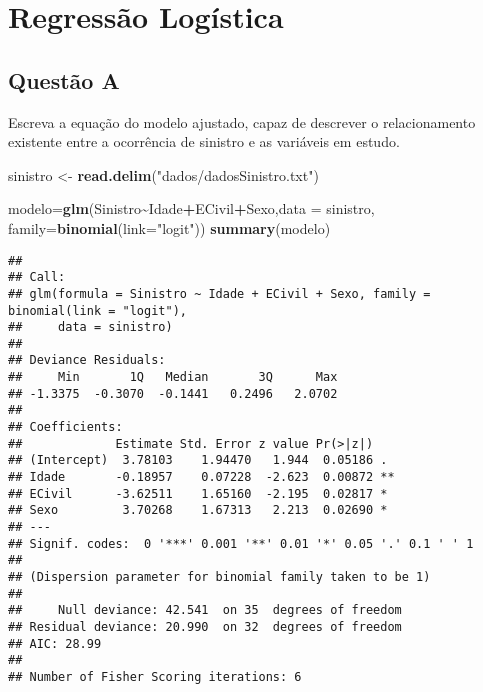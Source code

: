 \documentclass[
]{article}
\newenvironment{Shaded}{\begin{snugshade}}{\end{snugshade}}
\newcommand{\AttributeTok}[1]{\textcolor[rgb]{0.13,0.29,0.53}{#1}}
\newcommand{\FunctionTok}[1]{\textcolor[rgb]{0.13,0.29,0.53}{\textbf{#1}}}
\newcommand{\NormalTok}[1]{#1}
\newcommand{\OtherTok}[1]{\textcolor[rgb]{0.56,0.35,0.01}{#1}}
\newcommand{\SpecialCharTok}[1]{\textcolor[rgb]{0.81,0.36,0.00}{\textbf{#1}}}
\newcommand{\StringTok}[1]{\textcolor[rgb]{0.31,0.60,0.02}{#1}}
\begin{document}
\hypertarget{regressuxe3o-loguxedstica}{%
\section{Regressão Logística}\label{regressuxe3o-loguxedstica}}

\hypertarget{questuxe3o-a-1}{%
\subsection{Questão A}\label{questuxe3o-a-1}}

Escreva a equação do modelo ajustado, capaz de descrever o
relacionamento existente entre a ocorrência de sinistro e as variáveis
em estudo.

\begin{Shaded}
\begin{Highlighting}[]
\NormalTok{sinistro }\OtherTok{\textless{}{-}} \FunctionTok{read.delim}\NormalTok{(}\StringTok{"dados/dadosSinistro.txt"}\NormalTok{)}
\end{Highlighting}
\end{Shaded}

\begin{Shaded}
\begin{Highlighting}[]
\NormalTok{modelo}\OtherTok{=}\FunctionTok{glm}\NormalTok{(Sinistro}\SpecialCharTok{\textasciitilde{}}\NormalTok{Idade}\SpecialCharTok{+}\NormalTok{ECivil}\SpecialCharTok{+}\NormalTok{Sexo,}\AttributeTok{data =}\NormalTok{ sinistro,}
           \AttributeTok{family=}\FunctionTok{binomial}\NormalTok{(}\AttributeTok{link=}\StringTok{"logit"}\NormalTok{))}
\FunctionTok{summary}\NormalTok{(modelo)}
\end{Highlighting}
\end{Shaded}

\begin{verbatim}
## 
## Call:
## glm(formula = Sinistro ~ Idade + ECivil + Sexo, family = binomial(link = "logit"), 
##     data = sinistro)
## 
## Deviance Residuals: 
##     Min       1Q   Median       3Q      Max  
## -1.3375  -0.3070  -0.1441   0.2496   2.0702  
## 
## Coefficients:
##             Estimate Std. Error z value Pr(>|z|)   
## (Intercept)  3.78103    1.94470   1.944  0.05186 . 
## Idade       -0.18957    0.07228  -2.623  0.00872 **
## ECivil      -3.62511    1.65160  -2.195  0.02817 * 
## Sexo         3.70268    1.67313   2.213  0.02690 * 
## ---
## Signif. codes:  0 '***' 0.001 '**' 0.01 '*' 0.05 '.' 0.1 ' ' 1
## 
## (Dispersion parameter for binomial family taken to be 1)
## 
##     Null deviance: 42.541  on 35  degrees of freedom
## Residual deviance: 20.990  on 32  degrees of freedom
## AIC: 28.99
## 
## Number of Fisher Scoring iterations: 6
\end{verbatim}
\end{document}

